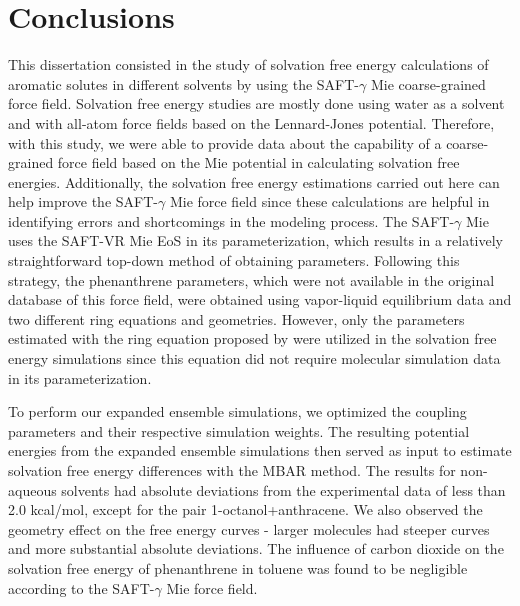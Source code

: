 \chapter{Conclusions} %

\label{Chapter6} 

This dissertation consisted in the study of solvation free energy calculations of aromatic solutes in different solvents by using the SAFT-$\gamma$ Mie coarse-grained force field. Solvation free energy studies are mostly done using water as a solvent and with all-atom force fields based on the Lennard-Jones potential. Therefore, with this study, we were able to provide data about the capability of a coarse-grained force field based on the Mie potential in calculating solvation free energies. Additionally, the solvation free energy estimations carried out here can help improve the SAFT-$\gamma$  Mie force field since these calculations are helpful in identifying errors and shortcomings in the modeling process. The SAFT-$\gamma$ Mie uses the SAFT-VR Mie EoS in its parameterization, which results in a relatively straightforward top-down method of obtaining parameters. Following this strategy, the phenanthrene parameters, which were not available in the original database of this force field, were obtained using vapor-liquid equilibrium data and two different ring equations and geometries. However, only the parameters estimated with the ring equation proposed by  were utilized in the solvation free energy simulations since this equation did not require molecular simulation data in its parameterization.

To perform our expanded ensemble simulations, we optimized the coupling parameters and their respective simulation weights. The resulting potential energies from the expanded ensemble simulations then served as input to estimate solvation free energy differences with the MBAR method. The results for non-aqueous solvents had absolute deviations from the experimental
data of less than 2.0 kcal/mol, except for the pair 1-octanol+anthracene. We also observed the geometry effect on the free energy curves - larger molecules had steeper curves and more substantial absolute deviations. The influence of carbon dioxide on the solvation free energy of phenanthrene in toluene was found to be negligible according to the SAFT-$\gamma$ Mie force field. 

